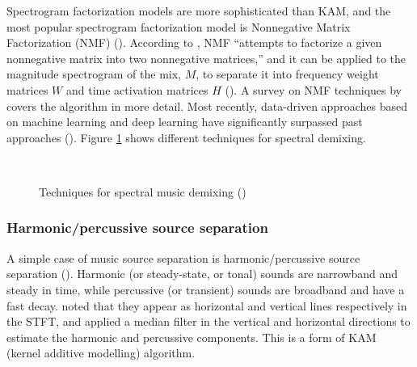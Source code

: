 \documentclass[report.tex]{subfiles}
\begin{document}
Spectrogram factorization models are more sophisticated than KAM, and the most popular spectrogram factorization model is Nonnegative Matrix Factorization (NMF) (\cite{musicmask, musicsepgood}). According to \citeauthor{musicsepgood}, NMF ``attempts to factorize a given nonnegative matrix into two nonnegative matrices,'' and it can be applied to the magnitude spectrogram of the mix, $M$, to separate it into frequency weight matrices $W$ and time activation matrices $H$ (\cite[12]{musicsepgood}). A survey on NMF techniques by \textcite{nmfpaper} covers the algorithm in more detail. Most recently, data-driven approaches based on machine learning and deep learning have significantly surpassed past approaches (\cite{musicsepgood, sisec2018}). Figure \ref{fig:spectraldemix} shows different techniques for spectral demixing.

\begin{figure}[ht]
	\centering
	\\
	\caption{Techniques for spectral music demixing (\cite[12, 14]{musicsepgood})}
	\label{fig:spectraldemix}
\end{figure}

\subsubsection{Harmonic/percussive source separation}
\label{sec:hpss}

A simple case of music source separation is harmonic/percussive source separation (\cite{musicsepgood}). Harmonic (or steady-state, or tonal) sounds are narrowband and steady in time, while percussive (or transient) sounds are broadband and have a fast decay. \textcite{fitzgerald1} noted that they appear as horizontal and vertical lines respectively in the STFT, and applied a median filter in the vertical and horizontal directions to estimate the harmonic and percussive components. This is a form of KAM (kernel additive modelling) algorithm.
\end{document}
